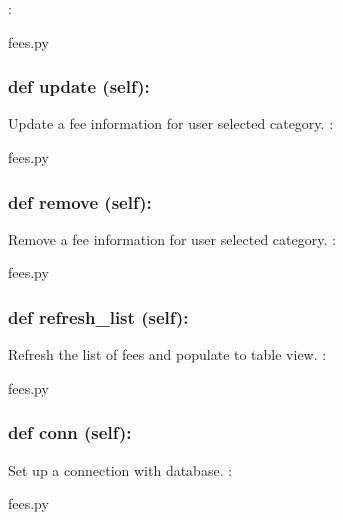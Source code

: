 :\begin{DoxyCompactItemize}
\item 
fees.\-py\end{DoxyCompactItemize}

\hypertarget{class_poly_a14a7ad77ce612b0c54f531d307ee4b39}{
\subsubsection[{def update (self):}]{\setlength{\rightskip}{0pt plus 5cm}def {update} (self):}}\label{class_poly_a14a7ad77ce612b0c54f531d307ee4b39}
Update a fee information for user selected category. 
:\begin{DoxyCompactItemize}
\item 
fees.\-py\end{DoxyCompactItemize}

\hypertarget{class_poly_a14a7ad77ce612b0c54f531d307ee4b39}{
\subsubsection[{def remove (self):}]{\setlength{\rightskip}{0pt plus 5cm}def {remove} (self):}}\label{class_poly_a14a7ad77ce612b0c54f531d307ee4b39}
Remove a fee information for user selected category. 
:\begin{DoxyCompactItemize}
\item 
fees.\-py\end{DoxyCompactItemize}

\hypertarget{class_poly_a14a7ad77ce612b0c54f531d307ee4b39}{
\subsubsection[{def refresh_list (self):}]{\setlength{\rightskip}{0pt plus 5cm}def {refresh\_list} (self):}}\label{class_poly_a14a7ad77ce612b0c54f531d307ee4b39}
Refresh the list of fees and populate to table view.
:\begin{DoxyCompactItemize}
\item 
fees.\-py\end{DoxyCompactItemize}

\hypertarget{class_poly_a14a7ad77ce612b0c54f531d307ee4b39}{
\subsubsection[{def conn (self):}]{\setlength{\rightskip}{0pt plus 5cm}def {conn} (self):}}\label{class_poly_a14a7ad77ce612b0c54f531d307ee4b39}
Set up a connection with database.
:\begin{DoxyCompactItemize}
\item 
fees.\-py\end{DoxyCompactItemize}


